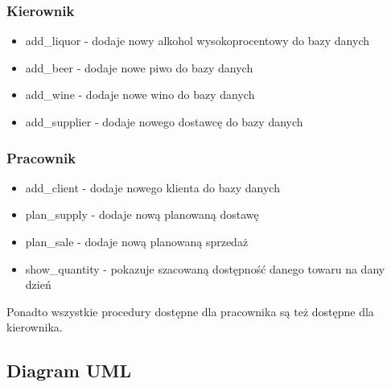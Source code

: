 \documentclass[12pt,a4paper]{article}
\begin{document}
    \subsubsection*{Kierownik}
        \begin{itemize}
            \item \textsf{add\_liquor} - dodaje nowy alkohol wysokoprocentowy do bazy danych
            \item \textsf{add\_beer} - dodaje nowe piwo do bazy danych
            \item \textsf{add\_wine} - dodaje nowe wino do bazy danych
            \item \textsf{add\_supplier} - dodaje nowego dostawcę do bazy danych
        \end{itemize}
    
    \subsubsection*{Pracownik}
        \begin{itemize}
            \item \textsf{add\_client} - dodaje nowego klienta do bazy danych
            \item \textsf{plan\_supply} - dodaje nową planowaną dostawę
            \item \textsf{plan\_sale} - dodaje nową planowaną sprzedaż
            \item \textsf{show\_quantity} - pokazuje szacowaną dostępność danego towaru na dany dzień
        \end{itemize}
        
        Ponadto wszystkie procedury dostępne dla pracownika są też dostępne dla kierownika.
        
\subsection*{Diagram UML}
        
\end{document}
